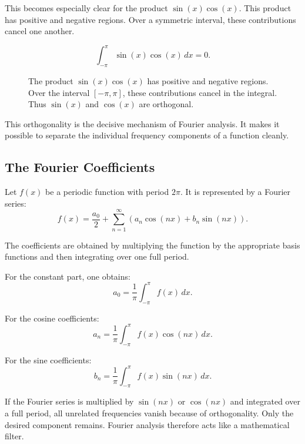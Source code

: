 This becomes especially clear for the product \(\sin(x)\cos(x)\).
This product has positive and negative regions.
Over a symmetric interval, these contributions cancel one another.

\[
\int_{-\pi}^{\pi}\sin(x)\cos(x)\,dx=0.
\]
\FloatBarrier
\begin{figure}[H]
	\centering
	\caption{The product $\sin(x)\cos(x)$ has positive and negative regions.
		Over the interval $[-\pi,\pi]$, these contributions cancel in the integral.
		Thus $\sin(x)$ and $\cos(x)$ are orthogonal.}
	\label{fig:sin_cos_produkt}
\end{figure}

This orthogonality is the decisive mechanism of Fourier analysis.
It makes it possible to separate the individual frequency components of a function cleanly.

\subsection{The Fourier Coefficients}

Let \(f(x)\) be a periodic function with period \(2\pi\).
It is represented by a Fourier series:
\[
f(x)=\frac{a_0}{2}
+\sum_{n=1}^{\infty}
\left(a_n\cos(nx)+b_n\sin(nx)\right).
\]

The coefficients are obtained by multiplying the function by the appropriate basis functions
and then integrating over one full period.

For the constant part, one obtains:
\[
a_0=\frac{1}{\pi}\int_{-\pi}^{\pi}f(x)\,dx.
\]

For the cosine coefficients:
\[
a_n=\frac{1}{\pi}\int_{-\pi}^{\pi}f(x)\cos(nx)\,dx.
\]

For the sine coefficients:
\[
b_n=\frac{1}{\pi}\int_{-\pi}^{\pi}f(x)\sin(nx)\,dx.
\]

\begin{DidacticBox}
	\label{box:anhangA-fourier-koeffizienten}
	\small
	If the Fourier series is multiplied by \(\sin(nx)\) or \(\cos(nx)\)
	and integrated over a full period,
	all unrelated frequencies vanish because of orthogonality.
	Only the desired component remains.
	Fourier analysis therefore acts like a mathematical filter.
\end{DidacticBox}


